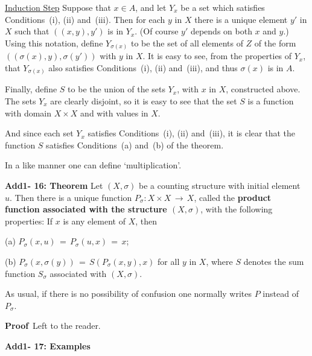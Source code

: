 {        \underline{Induction Step} Suppose that $x{\in}A$, and let $Y_{x}$ be a set which satisfies Conditions~(i), (ii) and~(iii).
    Then for each $y$ in $X$ there is a unique element $y'$ in $X$ such that $((x,y),y')$ is in $Y_{x}$.
    (Of course $y'$  depends on both $x$ and $y$.)
    Using this notation, define $Y_{{\sigma}(x)}$ to be the set of all elements  of $Z$ of the form $(({\sigma}(x),y),{\sigma}(y'))$ with $y$ in $X$.
    It is easy to see, from the properties of $Y_{x}$, that $Y_{{\sigma}(x)}$ also satisfies Conditions~(i), (ii) and~(iii), and thus ${\sigma}(x)$ is in $A$.

        Finally, define $S$ to be the union of the sets $Y_{x}$, with $x$ in $X$, constructed above.
    The sets $Y_{x}$ are clearly disjoint, so it is easy to see that the set $S$ is a function with domain $X{\times}X$ and with values in $X$.

    And since each set $Y_{x}$ satisfies Conditions~(i), (ii) and~(iii), it is clear that the function $S$ satisfies Conditions~(a) and~(b) of the theorem.

\V
\V

        In a like manner one can define `multiplication'.

\V

        {\bf Add1- 16: Theorem} Let $(X,{\sigma})$ be a counting structure with initial element~$u$.
    Then there is a unique function $P_{{\sigma}}:X{\times}X \,{\rightarrow}\, X$, called the {\bf product function associated with the structure $(X,{\sigma})$},
    with the following properties: If $x$ is any element of $X$, then

        (a) $P_{{\sigma}}(x,u) \,=\, P_{{\sigma}}(u,x) \,=\, x$;

        (b) $P_{{\sigma}}(x,{\sigma}(y)) \,=\, S(P_{{\sigma}}(x,y),x)$ for all $y$ in $X$, where $S$ denotes the sum function $S_{{\sigma}}$ associated with $(X,{\sigma})$.

\noindent As usual, if there is no possibility of confusion one normally writes $P$ instead of $P_{{\sigma}}$.

\V

        {\bf Proof}\,  Left to the reader.

\V
\V


        {\bf Add1- 17: Examples}

\V

}
